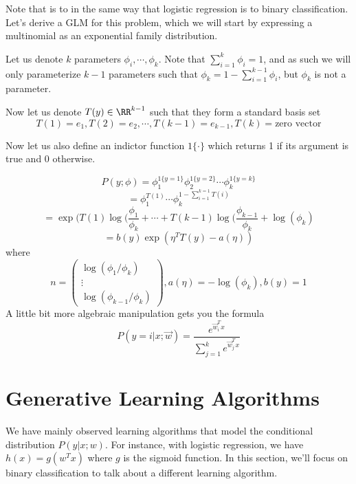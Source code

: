 \documentclass[12pt]{scrartcl}
\begin{document}
\begin{definition}
Note that  is to  in the same way that logistic regression is to binary classification. Let's derive a GLM for this problem, which we will start by expressing a multinomial as an exponential family distribution.
    
\end{definition}

Let us denote $k$ parameters $\phi_i, \cdots, \phi_k$. Note that $\sum_{i=1}^k \phi_i = 1$, and as such we will only parameterize $k-1$ parameters such that $\phi_k = 1 - \sum_{i=1}^{k-1}\phi_i$, but $\phi_k$ is not a parameter.

Now let us denote $T(y) \in \RR^{k-1}$ such that they form a standard basis set
\[T(1) = e_1, T(2) = e_2, \cdots ,T(k-1) = e_{k-1}, T(k) = \text{zero vector}\]

Now let us also define an indictor function $1\{\cdot\}$ which returns 1 if its argument is true and 0 otherwise.

\[P(y; \phi) = \phi_1^{1\{y=1\}}\phi_2^{1\{y=2\}}\cdots\phi_k^{1\{y=k\}}\]
\[= \phi_1^{T(1)}\cdots\phi_k^{1-\sum_{i=1}^{k=1}T(i)}\]
\[= \exp(T(1)\log(\frac{\phi_1}{\phi_k} + \cdots + T(k-1)\log(\frac{\phi_{k-1}}{\phi_k} + \log(\phi_k)\]
\[= b(y)\exp(\eta^TT(y) - a(\eta))\]
where 
\[n = \begin{pmatrix}
    \log(\phi_1/\phi_k)\\
    \vdots\\
    \log(\phi_{k-1}/\phi_k)
\end{pmatrix}, a(\eta) = -\log(\phi_k), b(y) = 1\]
A little bit more algebraic manipulation gets you the formula
\[P(y=i| x;\vec{w}) = \frac{e^{\vec{w}_i^Tx}}{\sum_{j=1}^k e^{\vec{w}_j^Tx}}\]

\section{Generative Learning Algorithms}

We have mainly observed learning algorithms that model the conditional distribution $P(y | x; w)$. For instance, with logistic regression, we have $h(x) = g(w^Tx)$ where $g$ is the sigmoid function. In this section, we'll focus on binary classification to talk about a different learning algorithm.\\
\end{document}
